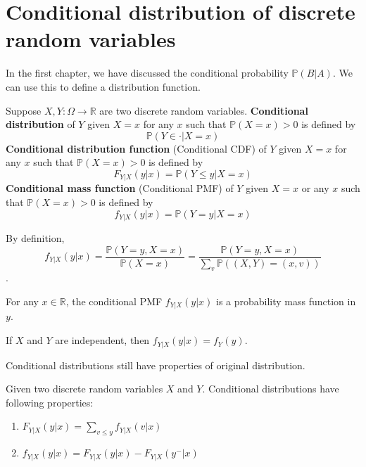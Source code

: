 \documentclass{huhtakm-template-book}
\newcommand{\prob}{\mathbb{P}}
\begin{document}
\section{Conditional distribution of discrete random variables}
    In the first chapter, we have discussed the conditional probability $\prob(B|A)$. We can use this to define a distribution function.
    \begin{defn}
        Suppose $X,Y:\Omega\to\mathbb{R}$ are two discrete random variables. \textbf{Conditional distribution} of $Y$ given $X=x$ for any $x$ such that $\prob(X=x)>0$ is defined by
        \begin{equation*}
            \prob(Y\in \cdot|X=x)
        \end{equation*}
        \textbf{Conditional distribution function} (Conditional CDF) of $Y$ given $X=x$ for any $x$ such that $\prob(X=x)>0$ is defined by
        \begin{equation*}
            F_{Y|X}(y|x)=\prob(Y\leq y|X=x)
        \end{equation*}
        \textbf{Conditional mass function} (Conditional PMF) of $Y$ given $X=x$ or any $x$ such that $\prob(X=x)>0$ is defined by
        \begin{equation*}
            f_{Y|X}(y|x)=\prob(Y=y|X=x)
        \end{equation*}
    \end{defn}
    \begin{rem}
        By definition, 
        \begin{equation*}
            f_{Y|X}(y|x)=\frac{\prob(Y=y,X=x)}{\prob(X=x)}=\frac{\prob(Y=y,X=x)}{\sum_{v}\prob((X,Y)=(x,v))}
        \end{equation*}.
    \end{rem}
    \begin{rem}
        For any $x\in\mathbb{R}$, the conditional PMF $f_{Y|X}(y|x)$ is a probability mass function in $y$.
    \end{rem}
    \begin{rem}
        If $X$ and $Y$ are independent, then $f_{Y|X}(y|x)=f_{Y}(y)$.
    \end{rem}
    Conditional distributions still have properties of original distribution.
    \begin{lem}
        Given two discrete random variables $X$ and $Y$. Conditional distributions have following properties:
        \begin{enumerate}
            \item $F_{Y|X}(y|x)=\sum_{v\leq y}f_{Y|X}(v|x)$
            \item $f_{Y|X}(y|x)=F_{Y|X}(y|x)-F_{Y|X}(y^{-}|x)$
        \end{enumerate}
    \end{lem}
\end{document}
